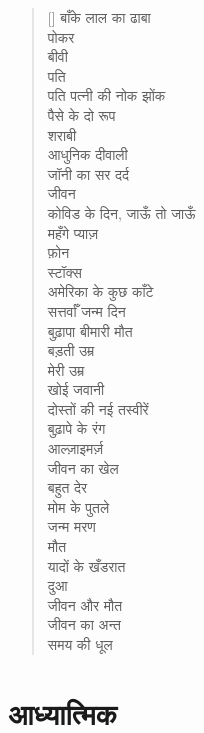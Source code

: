 \begin{verse}[\versewidth]\texthindi{
बाँके लाल का ढाबा\\
पोकर\\
बीवी\\
पति\\
पति पत्नी की नोक झोंक\\
पैसे के दो रूप\\
शराबी\\
आधुनिक दीवाली\\
जॉनी का सर दर्द\\
जीवन\\
कोविड के दिन, जाऊँ तो जाऊँ\\
महँगे प्याज़\\
फ़ोन\\
स्टॉक्स\\
अमेरिका के कुछ काँटे\\
सत्तर्वाँ जन्म दिन\\
बुढ़ापा बीमारी मौत\\
बड़ती उम्र\\
मेरी उम्र\\
खोई जवानी\\
दोस्तों की नई तस्वीरें\\
बुढ़ापे के रंग\\
आल्ज़ाइमर्ज़\\
जीवन का खेल\\
बहुत देर\\
मोम के पुतले\\
जन्म मरण\\
मौत\\
यादों के खँडरात\\
दुआ\\
जीवन और मौत\\
जीवन का अन्त\\
समय की धूल
}
\end{verse}

\chapter{\texthindi{आध्यात्मिक}}

